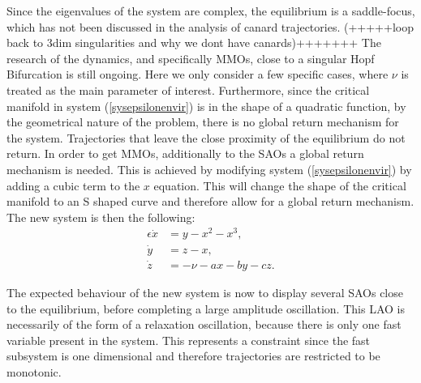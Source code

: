 Since the eigenvalues of the system are complex, the equilibrium is a saddle-focus, which has not been discussed in the analysis of canard trajectories. (+++++loop back to 3dim singularities and why we dont have canards)+++++++
The research of the dynamics, and specifically MMOs, close to a singular Hopf Bifurcation is still ongoing. Here we only consider a few specific cases, where $\nu$ is treated as the main parameter of interest. Furthermore, since the critical manifold in system (\ref{sysepsilonenvir}) is in the shape of a quadratic function, by the geometrical nature of the problem, there is no global return mechanism for the system. Trajectories that leave the close proximity of the equilibrium do not return. In order to get MMOs, additionally to the SAOs a global return mechanism is needed.
This is achieved by modifying system (\ref{sysepsilonenvir}) by adding a cubic term to the $x$ equation. This will change the shape of the critical manifold to an S shaped curve and therefore allow for a global return mechanism. The new system is then the following:
\begin{align*}
\epsilon \dot{x} &= y - x^2 - x^3, \\
\dot{y} &= z - x, \\
\dot{z} &= -\nu -ax -by -cz.
\end{align*}

The expected behaviour of the new system is now to display several SAOs close to the equilibrium, before completing a large amplitude oscillation. This LAO is necessarily of the form of a relaxation oscillation, because there is only one fast variable present in the system. This represents a constraint since the fast subsystem is one dimensional and therefore trajectories are restricted to be monotonic.





































